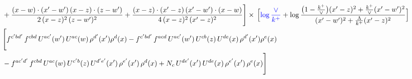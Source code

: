 \documentclass[9pt]{article}
\numberwithin{equation}{section}
\begin{document}
\begin{align}
& +\frac{(x-w)\cdot (x'-w')\, (x-z)\cdot (z-w')}{2\, (x-z)^{2}\, (z-w')^{2}}+\frac{(x-z)\cdot (x'-z)\, (x'-w')\cdot (x-w)}{4\, (x-z)^{2}\, (x'-z)^{2}}\Bigg] \times\,\Big[{\color{blue}\log\frac{\vee}{k^{+}}}+\log\frac{\big(1-\frac{k^{+}}{\vee}\big)(x'-z)^{2}+\frac{k^{+}}{\vee}(x'-w')^{2}}{(x'-w')^{2}+\frac{\Lambda}{k^{+}}(x'-z)^{2}}\Big] \notag \\ & \Bigg[f^{c'bd'}\,f^{cbd}\, U^{ac'}(w')\,U^{ac}(w)\,\rho^{d'}(x')\rho^{d}(x)- f^{c'bd'}\,f^{acd}\,U^{ac'}(w')\,U^{cb}(z)\,U^{de}(x)\,\rho^{d'}(x')\rho^{e}(x) \notag \\ & -f^{ac'd'}\,f^{cbd}\,U^{ac}(w)\,U^{c'b}(z)\,U^{d'e'}(x')\,\rho^{e'}(x')\,\rho^{d}(x) +N_{c}\,U^{de'}(x')\,U^{de}(x)\,\rho^{e'}(x')\,\rho^{e}(x)\Bigg]
\end{align}

\begin{align}

\end{align}
\end{document}
